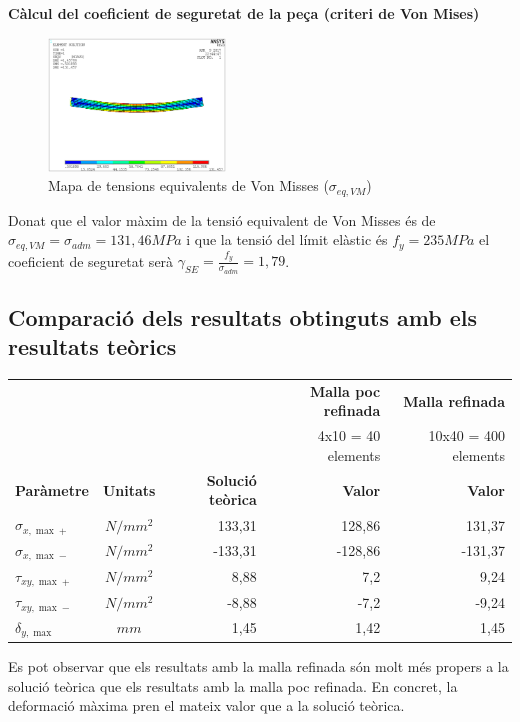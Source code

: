 \documentclass[a4paper]{article}
\def\imgS{0.42\textwidth}
\begin{document}
\textbf{Càlcul del coeficient de seguretat de la peça (criteri de Von Mises)}
\begin{figure}[H]
	\centering
	\includegraphics[width=\imgS]{images/400_von_misses}
	\caption{Mapa de tensions equivalents de Von Misses ($\sigma_{eq,VM}$)}
	\label{fig:400_von_misses}
\end{figure}
Donat que el valor màxim de la tensió equivalent de Von Misses és de $\sigma_{eq,VM} = \sigma_{adm} = 131,46 MPa$ i que la tensió del límit elàstic és $f_y = 235 MPa$ el coeficient de seguretat serà $\gamma_{SE} = \frac{f_y}{\sigma_{adm}} = 1,79$.

\subsection{Comparació dels resultats obtinguts amb els resultats teòrics}
\begin{table}[H]
	\centering
	\begin{tabular}{|l|c|r|r|r|}
		\cline{4-5}
		\multicolumn{3}{c|}{\multirow{2}{*}{}} & \textbf{Malla poc refinada} & \textbf{Malla refinada} \\
		\multicolumn{3}{c|}{} & 4x10 = 40 elements & 10x40 = 400 elements \\
		\hline
		\textbf{Paràmetre} & \textbf{Unitats} & \textbf{Solució teòrica} & \textbf{Valor} & \textbf{Valor} \\
		\hline
		$\sigma_{x,\max+}$ & $N/mm^2$ & 133,31 & 128,86 & 131,37 \\
		$\sigma_{x,\max-}$ & $N/mm^2$ & -133,31 & -128,86 & -131,37 \\
		$\tau_{xy,\max+}$ & $N/mm^2$ & 8,88 & 7,2 & 9,24 \\
		$\tau_{xy,\max-}$ & $N/mm^2$ & -8,88 & -7,2 & -9,24 \\
		$\delta_{y,\max}$ & $mm$ & 1,45 & 1,42 & 1,45 \\
		\hline
	\end{tabular}
\end{table}
Es pot observar que els resultats amb la malla refinada són molt més propers a la solució teòrica que els resultats amb la malla poc refinada. En concret, la deformació màxima pren el mateix valor que a la solució teòrica.
\end{document}
